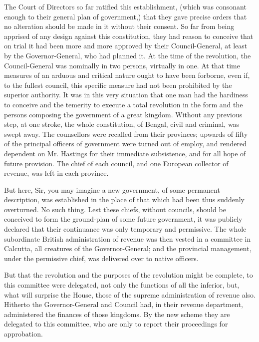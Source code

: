 The Court of Directors so far ratified this establishment, (which was consonant enough to their general plan of government,) that they gave precise orders that no alteration should be made in it without their consent. So far from being apprised of any design against this constitution, they had reason to conceive that on trial it had been more and more approved by their Council-General, at least by the Governor-General, who had planned it. At the time of the revolution, the Council-General was nominally in two persons, virtually in one. At that time measures of an arduous and critical nature ought to have been forborne, even if, to the fullest council, this specific measure had not been prohibited by the superior authority. It was in this very situation that one man had the hardiness to conceive and the temerity to execute a total revolution in the form and the persons composing the government of a great kingdom. Without any previous step, at one stroke, the whole constitution, of Bengal, civil and criminal, was swept away. The counsellors were recalled from their provinces; upwards of fifty of the principal officers of government were turned out of employ, and rendered dependent on Mr. Hastings for their immediate subsistence, and for all hope of future provision. The chief of each council, and one European collector of revenue, was left in each province.

But here, Sir, you may imagine a new government, of some permanent description, was established in the place of that which had been thus suddenly overturned. No such thing. Lest these chiefs, without councils, should be conceived to form the ground-plan of some future government, it was publicly declared that their continuance was only temporary and permissive. The whole subordinate British administration of revenue was then vested in a committee in Calcutta, all creatures of the Governor-General; and the provincial management, under the permissive chief, was delivered over to native officers.

But that the revolution and the purposes of the revolution might be complete, to this committee were delegated, not only the functions of all the inferior, but, what will surprise the House, those of the supreme administration of revenue also. Hitherto the Governor-General and Council had, in their revenue department, administered the finances of those kingdoms. By the new scheme they are delegated to this committee, who are only to report their proceedings for approbation.

